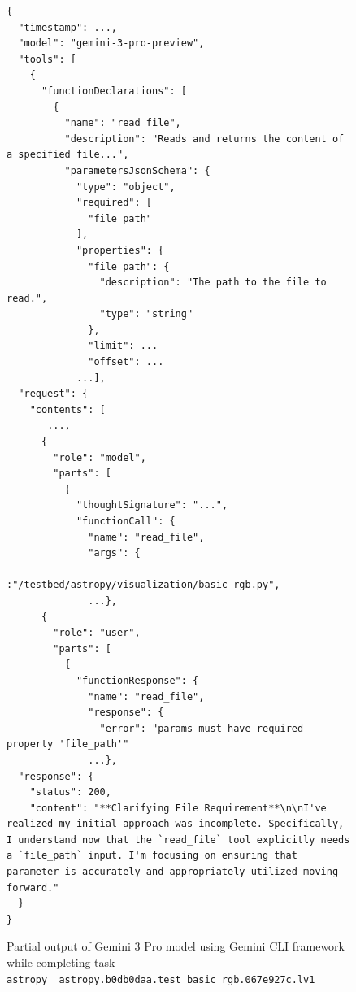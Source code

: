 \documentclass{article}
\begin{document}
\begin{figure}[h]
\centering
\begin{tcolorbox}[
    colback=white,
    colframe=black!60,
    coltitle=white,
    colbacktitle=black!60,
    title=Output Analysis of Gemini 3 Pro,
    fonttitle=\bfseries,
    boxrule=0.7pt,
    arc=1mm,
    width=1.\linewidth,
    enhanced,
    overlay={
        \node[red, fill=yellow!20, draw=red!50, thick, rounded corners=2pt, 
              inner sep=2pt, anchor=base west, font=\ttfamily\footnotesize] 
              at ([xshift=3.7cm, yshift=-13.28cm]frame.north west) 
              {"path"};
    }
]
\begin{lstlisting}[basicstyle=\footnotesize\ttfamily, breaklines=true]
{
  "timestamp": ...,
  "model": "gemini-3-pro-preview",
  "tools": [
    {
      "functionDeclarations": [
        {
          "name": "read_file",
          "description": "Reads and returns the content of a specified file...",
          "parametersJsonSchema": {
            "type": "object",
            "required": [
              "file_path" 
            ],
            "properties": {
              "file_path": {
                "description": "The path to the file to read.",
                "type": "string"
              },
              "limit": ...
              "offset": ...
            ...],
  "request": {
    "contents": [
       ...,
      {
        "role": "model",
        "parts": [
          {
            "thoughtSignature": "...",
            "functionCall": {
              "name": "read_file",
              "args": {
                       :"/testbed/astropy/visualization/basic_rgb.py",
              ...},
      {
        "role": "user",
        "parts": [
          {
            "functionResponse": {
              "name": "read_file",
              "response": {
                "error": "params must have required property 'file_path'"
              ...},
  "response": {
    "status": 200,
    "content": "**Clarifying File Requirement**\n\nI've realized my initial approach was incomplete. Specifically, I understand now that the `read_file` tool explicitly needs a `file_path` input. I'm focusing on ensuring that parameter is accurately and appropriately utilized moving forward."
  }
}
\end{lstlisting}
\end{tcolorbox}
\caption{Partial output of Gemini 3 Pro model using Gemini CLI framework while completing task \texttt{astropy\_\_astropy.b0db0daa.test\_basic\_rgb.067e927c.lv1}}
\label{fig:gemini-destructive}
\end{figure}
\end{document}
